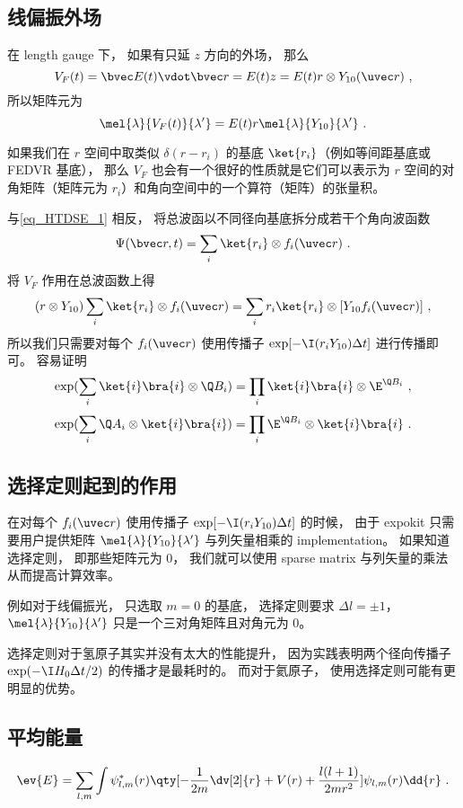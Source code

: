 \subsection{线偏振外场}
在 length gauge 下， 如果有只延 $z$ 方向的外场， 那么
\begin{equation}
V_F(t) = \bvec E(t) \vdot \bvec r =  E(t) z = E(t) r \otimes Y_{10}(\uvec r)~,
\end{equation}
所以矩阵元为
\begin{equation}
\mel{\lambda}{V_F(t)}{\lambda'} =  E(t) r \mel{\lambda}{Y_{10}}{\lambda'}~.
\end{equation}

如果我们在 $r$ 空间中取类似 $\delta(r - r_i)$ 的基底 $\ket{r_i}$（例如等间距基底或 FEDVR 基底）， 那么 $V_F$ 也会有一个很好的性质就是它们可以表示为 $r$ 空间的对角矩阵（矩阵元为 $r_i$）和角向空间中的一个算符（矩阵）的张量积。 

与\autoref{eq_HTDSE_1} 相反， 将总波函以不同径向基底拆分成若干个角向波函数
\begin{equation}
\Psi(\bvec r, t) = \sum_i \ket{r_i} \otimes f_i(\uvec r)~.
\end{equation}
将 $V_F$ 作用在总波函数上得
\begin{equation}
(r \otimes Y_{10})\sum_i \ket{r_i} \otimes f_i(\uvec r)
= \sum_i r_i\ket{r_i} \otimes [Y_{10} f_i(\uvec r)]~,
\end{equation}
所以我们只需要对每个 $f_i(\uvec r)$ 使用传播子 $\exp[-\I (r_i Y_{10}) \Delta t]$ 进行传播即可。 容易证明%
\begin{equation}
\exp(\sum_i \ket{i}\bra{i} \otimes \Q B_i) = \prod_i \ket{i}\bra{i} \otimes  \E^{\Q B_i}~,
\end{equation}
\begin{equation}
\exp(\sum_i  \Q A_i \otimes \ket{i}\bra{i}) = \prod_i  \E^{\Q B_i} \otimes \ket{i}\bra{i}~.
\end{equation}

\subsection{选择定则起到的作用}
在对每个 $f_i(\uvec r)$ 使用传播子 $\exp[-\I (r_i Y_{10}) \Delta t]$ 的时候， 由于 expokit 只需要用户提供矩阵 $\mel{\lambda}{Y_{10}}{\lambda'}$ 与列矢量相乘的 implementation。 如果知道选择定则， 即那些矩阵元为 0， 我们就可以使用 sparse matrix 与列矢量的乘法从而提高计算效率。

例如对于线偏振光， 只选取 $m = 0$ 的基底， 选择定则要求 $\Delta l = \pm 1$， $\mel{\lambda}{Y_{10}}{\lambda'}$ 只是一个三对角矩阵且对角元为 0。

选择定则对于氢原子其实并没有太大的性能提升， 因为实践表明两个径向传播子 $\exp(-\I H_0 \Delta t/2)$ 的传播才是最耗时的。 而对于氦原子， 使用选择定则可能有更明显的优势。


\subsection{平均能量}
\begin{equation}
\ev{E} = \sum_{l,m} \int \psi^*_{l,m}(r) \qty[-\frac{1}{2m}\dv[2]{r} + V(r) + \frac{l(l+1)}{2mr^2}] \psi_{l,m}(r) \dd{r}~.
\end{equation}
